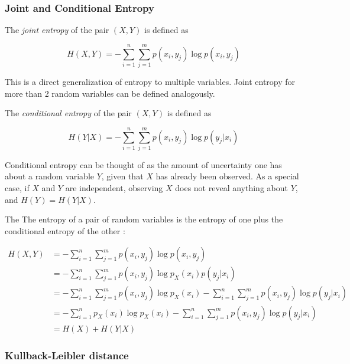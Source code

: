 \documentclass[12pt]{article}
\begin{document}
\subsubsection{Joint and Conditional Entropy}

The \textit{joint entropy} \cite{cover-thomas} of the pair $(X,Y)$ is defined as 

\begin{equation}
H(X,Y) = -\sum_{i=1}^n \sum_{j=1}^m p(x_i,y_j) \log p(x_i,y_j)
\label{eq:cond-etropy}
\end{equation}

This is a direct generalization of entropy to multiple variables. Joint entropy for more than 2 random variables can be defined analogously.

The \textit{conditional entropy} \cite{cover-thomas} of the pair $(X,Y)$ is defined as 

\begin{equation}
H(Y|X) = - \sum_{i=1}^n \sum_{j=1}^m p(x_i,y_j) \log p(y_j|x_i)
\end{equation}

Conditional entropy can be thought of as the amount of uncertainty one has about a random variable $Y$, given that $X$ has already been observed. As a special case, if $X$ and $Y$ are independent, observing $X$ does not reveal anything about $Y$, and $H(Y) = H(Y|X)$.

The  
The entropy of a pair of random variables is the entropy of one plus the conditional entropy of the other \cite{cover-thomas}: 

\begin{equation}
\begin{split}
H(X,Y) & = -\sum_{i=1}^n \sum_{j=1}^m p(x_i,y_j) \log p(x_i,y_j) \\
 	   & = -\sum_{i=1}^n \sum_{j=1}^m p(x_i,y_j) \log p_X(x_i)p(y_j|x_i) \\ 
 	   & = -\sum_{i=1}^n \sum_{j=1}^m p(x_i,y_j) \log p_X(x_i) - \sum_{i=1}^n \sum_{j=1}^m p(x_i,y_j) \log p(y_j|x_i) \\
 	   & = -\sum_{i=1}^n p_X(x_i) \log p_X(x_i) - \sum_{i=1}^n \sum_{j=1}^m p(x_i,y_j) \log p(y_j|x_i) \\ 
 	   & = H(X) + H(Y|X)
\label{eq:chain-rule-entropy}
\end{split}
\end{equation}


\subsubsection{Kullback-Leibler distance}
\end{document}
